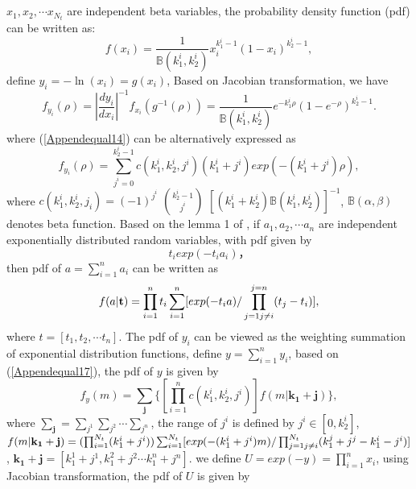 \documentclass[12pt, draftclsnofoot, onecolumn]{IEEEtran}
\begin{document}
\begin{spacing}{2}
\section{}
$x_{1}, x_{2}, \cdots x_{N_{t}}$ are independent beta variables, the probability density function (pdf) can be written as: 
\begin{equation}
f(x_{i})=\frac{1}{\mathbb{B}(k_{1}^{i}, k_{2}^{i})}x_{i}^{k_{1}^{i}-1}(1-x_{i})^{k_{2}^{i}-1},
\label{Appendequal13}
\end{equation}
define $y_{i}=-\ln(x_{i})=g(x_{i})$, Based on Jacobian transformation, we have 
\begin{equation}
f_{y_{i}}(\rho)=|\frac{dy_{i}}{dx_{i}}|^{-1}f_{x_{i}}(g^{-1}(\rho))=\frac{1}{\mathbb{B}(k_{1}^{i},k_{2}^{i})}e^{-k_{1}^{i}\rho}(1-e^{-\rho})^{k_{2}^{i}-1}.
\label{Appendequal14}
\end{equation}
where (\ref{Appendequal14}) can be alternatively expressed as \cite{bhargava1981distribution}
\begin{equation}
f_{y_{i}}(\rho)=\sum_{j^{i}=0}^{k_{2}^{i}-1}c(k_{1}^{i},k_{2}^{i}, j^{i})(k_{1}^{i}+j^{i})exp(-(k_{1}^{i}+j^{i})\rho),
\label{Appendequal15}
\end{equation} 
where $c(k_{1}^{i}, k_{2}^{i}, j_{i})=(-1)^{j^{i}}$ $k_{2}^{i}-1\choose j^{i}$ $[(k_{1}^{i}+k_{2}^{i})\mathbb{B}(k_{1}^{i},k_{2}^{i})]^{-1}$, $\mathbb{B}(\alpha, \beta)$ denotes beta function. Based on the lemma 1 of \cite{bhargava1981distribution}, if $a_{1}, a_{2}, \cdots a_{n}$ are independent exponentially distributed random variables, with pdf given by
\begin{equation}
t_{i}exp(-t_{i}a_{i})，
\label{Appendequal16}
\end{equation} 
then pdf of $a=\sum_{i=1}^{n}a_{i}$ can be written as
\begin{equation}
f(a|\mathbf{t})=\prod_{i=1}^{n}t_{i}\sum_{i=1}^{n}[exp(-t_{i}a)/\prod_{j=1\\ j\neq i}^{j=n}(t_{j}-t_{i})],
\label{Appendequal17}
\end{equation}
where $t=[t_{1}, t_{2}, \cdots t_{n}]$. The pdf of $y_{i}$ can be viewed as the weighting summation of exponential distribution functions, define $y=\sum_{i=1}^{n}y_{i}$, based on (\ref{Appendequal17}), the pdf of $y$ is given by
\begin{equation}
f_{y}(m)=\sum_{\mathbf{j}}\{[\prod_{i=1}^{n}c(k_{1}^{i},k_{2}^{i}, j^{i})]f(m|\mathbf{k_{1}}+\mathbf{j})\},
\label{Appendequal18}
\end{equation}
where $\sum_{\mathbf{j}}=\sum_{j^{1}}\sum_{j^{2}}\cdots \sum_{j^{n}}$, the range of $j^{i}$ is defined by $j^{i}\in [0, k_{2}^{i}]$, $f(m|\mathbf{k_{1}}+\mathbf{j})=(\prod_{i=1}^{N_{t}}(k_{1}^{i}+j^{i}))\sum_{i=1}^{N_{t}}[exp(-(k_{1}^{i}+j^{i})m)/\prod_{j=1\\ j\neq i}^{N_{t}}(k_{1}^{j}+j^{j}-k_{1}^{i}-j^{i})]$, $\mathbf{k_{1}}+\mathbf{j}=[k_{1}^{1}+j^{1}, k_{1}^{2}+j^{2} \cdots k_{1}^{n}+j^{n}]$. we define $U=exp(-y)=\prod_{i=1}^{n}x_{i}$, using Jacobian transformation, the pdf of $U$ is given by 

\end{spacing}
\end{document}
